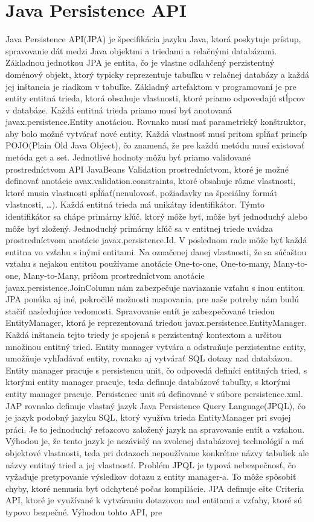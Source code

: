 \section{Java Persistence API}
Java Persistence API(JPA) je špecifikácia jazyku Java, ktorá poskytuje prístup, spravovanie dát medzi Java objektmi a triedami a relačnými databázami. Základnou jednotkou JPA je entita, čo je vlastne odľahčený perzistentný doménový objekt, ktorý typicky reprezentuje tabuľku v relačnej databázy a každá jej inštancia je riadkom v  tabuľke. Základný artefaktom v programovaní je pre entity entitná trieda, ktorá obsahuje vlastnosti, ktoré priamo odpovedajú stĺpcov v databáze. Každá entitná trieda priamo musí byť anotovaná javax.persistence.Entity anotáciou. Rovnako musí mať parametrický konštruktor, aby bolo možné vytvárať nové entity. Každá vlastnosť musí pritom spĺňať princíp POJO(Plain Old Java Object), čo znamená, že pre každú metódu musí existovať metóda get a set. Jednotlivé hodnoty môžu byť priamo validované prostredníctvom API JavaBeans Validation prostredníctvom, ktoré je možné definovať anotácie avax.validation.constraints, ktoré obsahuje rôzne vlastnosti, ktoré musia vlastnosti spĺňať(nenulovosť, požiadavky na špeciálny formát vlastnosti, \ldots). Každá entitná trieda má unikátny identifikátor. Týmto identifikátor sa chápe primárny kľúč, ktorý môže byť, môže byť jednoduchý alebo môže byť zložený. Jednoduchý primárny kľúč sa v entitnej triede uvádza prostredníctvom anotácie javax.persistence.Id. V poslednom rade môže byť každá entitna vo vzťahu s inými entitami. Na označenej danej vlastnosti, že sa súčaštou vzťahu s nejakou entitou používame anotácie One-to-one, One-to-many, Many-to-one, Many-to-Many, pričom prostredníctvom anotácie javax.persistence.JoinColumn nám zabezpečuje naviazanie vzťahu s inou entitou. JPA ponúka aj iné, pokročilé možnosti mapovania, pre naše potreby nám budú stačiť nasledujúce vedomosti. Spravovanie entít je zabezpečované triedou EntityManager, ktorá je reprezentovaná triedou javax.persistence.EntityManager. Každá inštancia tejto triedy je spojená s perzistentný kontextom a určitou množinou entitný tried. Entity manager vytvára a odstraňuje perzistentne entity, umožňuje vyhľadávať entity, rovnako aj vytvárať SQL dotazy nad databázou. Entity manager pracuje s persistencu unit, čo odpovedá definíci entitných tried, s ktorými entity manager pracuje, teda definuje databázové tabuľky, s ktorými entity manager pracuje. Persistence unit sú definované v súbore persistence.xml. JAP rovnako definuje vlastný jazyk Java Persistence Query Language(JPQL), čo je jazyk podobný jazyku SQL, ktorý využíva trieda EntityManager pri svojej práci. Je to jednoduchý reťazcovo založený jazyk na spravovanie entít a vzťahou. Výhodou je, že tento jazyk je nezávislý na zvolenej databázovej technológií a má objektové vlastnosti, teda pri dotazoch nepoužívame konkrétne názvy tabuliek ale názvy entitný tried a jej vlastností. Problém JPQL je typová nebezpečnosť, čo vyžaduje pretypovanie výsledkov dotazu z entity manager-a. To môže spôsobiť chyby, ktoré nemusia byť odchytené počas kompilácie. JPA definuje ešte Criteria API, ktoré je využívané k vytváraniu dotazovou nad entitami a vzťahy, ktoré sú typovo bezpečné. Výhodou tohto API, pre 